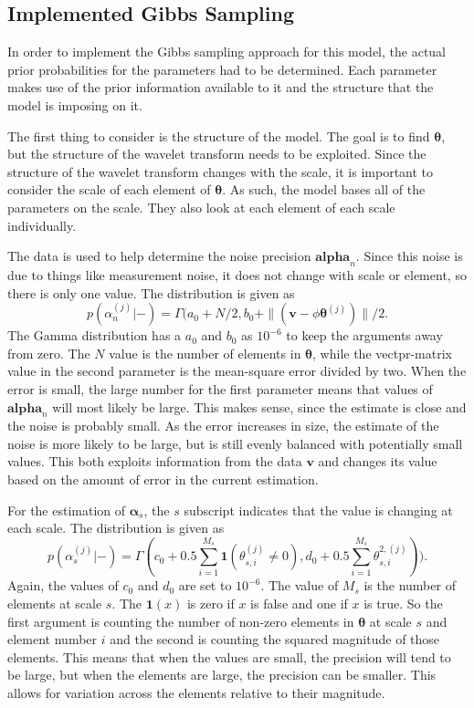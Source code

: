 \documentclass{IEEEtran}
\begin{document}
\subsection{Implemented Gibbs Sampling}

In order to implement the Gibbs sampling approach for this model, the
actual prior probabilities for the parameters had to be
determined. Each parameter makes use of the prior information
available to it and the structure that the model is imposing on it.

The first thing to consider is the structure of the model.  The
goal is to find $\mathbf{\theta}$, but the structure of the wavelet
transform needs to be exploited.  Since the structure of the wavelet
transform changes with the scale, it is important to consider the
scale of each element of $\mathbf{\theta}$.  As such, the model bases
all of the parameters on the scale.  They also look at each element of
each scale individually.  

The data is used to help determine the noise precision
$\mathbf{alpha}_n$.  Since this noise is due to things like
measurement noise, it does not change with scale or element, so there
is only one value.  The distribution is given as 
\begin{equation}
 p(\alpha_n^{(j)}|-) =
    \Gamma(a_0+N/2,b_0+\|(\mathbf{v}-\phi\mathbf{\theta}^{(j)})\|/2 .
\label{alphan}
\end{equation}
The Gamma distribution has a $a_0$ and $b_0$ as $10^{-6}$ to keep the
arguments away from zero.  The $N$ value is the number of elements in
$\mathbf{\theta}$, while the vectpr-matrix value in the second
parameter is the mean-square error divided by two.  When the error is
small, the large number for the first parameter means that values of
$\mathbf{alpha}_n$ will most likely be large.  This makes sense, since
the estimate is close and the noise is probably small.  As the error
increases in size, the estimate of the noise is more likely to be
large, but is still evenly balanced with potentially small values.
This both exploits information from the data $\mathbf{v}$ and changes
its value based on the amount of error in the current estimation.

For the estimation of $\mathbf{\alpha}_s$, the $s$ subscript indicates
that the value is changing at each scale.  The distribution is given
as 
\begin{equation}
    p(\alpha_s^{(j)}|-) =  \Gamma(c_0+0.5\sum_{i=1}^{M_s}\mathbf{1}(\theta_{s,i}^{(j)}\neq
    0), d_0+0.5\sum_{i=1}^{M_s}\theta_{s,i}^{2,(j)})).
\label{alphas}
\end{equation}
Again, the values of $c_0$ and $d_0$ are set to $10^{-6}$.  The value
of $M_s$ is the number of elements at scale $s$.  The
$\mathbf{1}(x)$ is zero if $x$ is false and one if $x$ is true.  So
the first argument is counting the number of non-zero elements in
$\mathbf{\theta}$ at scale $s$ and element number $i$ and the
second is counting the squared magnitude of those elements.  This
means that when the values are small, the precision will tend to be
large, but when the elements are large, the precision can be smaller.
This allows for variation across the elements relative to their
magnitude.
\end{document}
